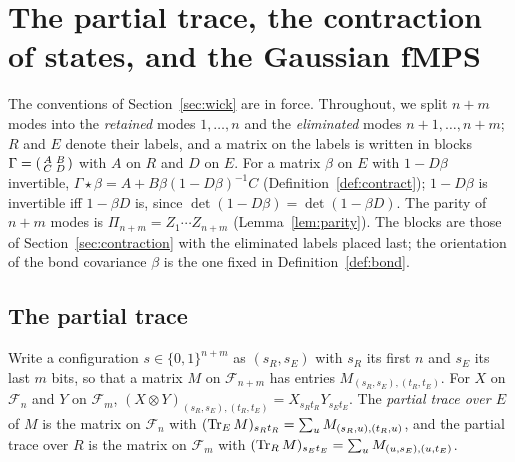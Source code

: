 \section{The partial trace, the contraction of states, and the Gaussian fMPS}
\label{sec:gaussianmap}

The conventions of Section~\ref{sec:wick} are in force. Throughout, we split $n+m$ modes into
the \emph{retained} modes $1,\ldots,n$ and the \emph{eliminated} modes $n+1,\ldots,n+m$; $R$ and $E$
denote their labels, and a matrix on the labels is written in blocks
$\Gamma=\begin{psmallmatrix}A&B\\C&D\end{psmallmatrix}$ with $A$ on $R$ and $D$ on $E$. For a
matrix $\beta$ on $E$ with $1-D\beta$ invertible, $\Gamma\star\beta=A+B\beta(1-D\beta)^{-1}C$
(Definition~\ref{def:contract}); $1-D\beta$ is invertible iff $1-\beta D$ is, since
$\det(1-D\beta)=\det(1-\beta D)$. The parity of $n+m$ modes is $\Pi_{n+m}=Z_1\cdots Z_{n+m}$
(Lemma~\ref{lem:parity}). The blocks are those of Section~\ref{sec:contraction} with the
eliminated labels placed last; the orientation of the bond covariance $\beta$ is the one fixed
in Definition~\ref{def:bond}.

\subsection{The partial trace}
\label{sec:ptrace}

\begin{definition}\label{def:ptrace}
Write a configuration $s\in\{0,1\}^{n+m}$ as $(s_R,s_E)$ with $s_R$ its first $n$ and $s_E$ its last
$m$ bits, so that a matrix $M$ on $\mathcal F_{n+m}$ has entries $M_{(s_R,s_E),(t_R,t_E)}$. For $X$ on
$\mathcal F_n$ and $Y$ on $\mathcal F_m$, $(X\otimes Y)_{(s_R,s_E),(t_R,t_E)}=X_{s_Rt_R}Y_{s_Et_E}$.
The \emph{partial trace over $E$} of $M$ is the matrix on $\mathcal F_n$ with
$(\operatorname{Tr}_{E}M)_{s_Rt_R}=\sum_uM_{(s_R,u),(t_R,u)}$, and the partial trace over $R$ is the matrix on
$\mathcal F_m$ with $(\operatorname{Tr}_{R}M)_{s_Et_E}=\sum_uM_{(u,s_E),(u,t_E)}$.
\end{definition}

